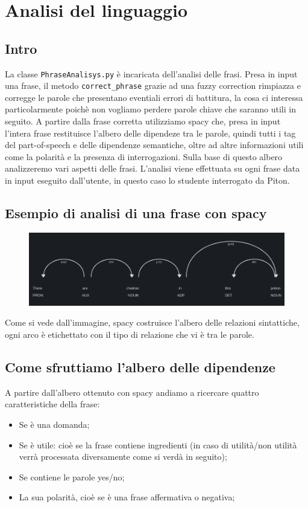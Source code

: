 \section{Analisi del linguaggio}
\subsection{Intro}
La classe \texttt{PhraseAnalisys.py} è incaricata dell'analisi delle frasi.
Presa in input una frase, il metodo \texttt{correct\_phrase} grazie ad una fuzzy correction rimpiazza e corregge le parole che presentano eventiali errori di battitura, la cosa ci interessa particolarmente poichè non vogliamo perdere parole chiave che saranno utili in seguito.
A partire dalla frase corretta  utilizziamo spacy che, presa in input l'intera frase restituisce l'albero delle dipendeze tra le parole, quindi tutti i tag del part-of-speech e delle dipendenze semantiche, oltre ad altre informazioni utili come la polarità e la presenza di interrogazioni. Sulla base di questo albero analizzeremo vari aspetti delle frasi. L'analisi viene effettuata su ogni frase data in input eseguito dall'utente, in questo caso lo studente interrogato da Piton.


\subsection{Esempio di analisi di una frase con spacy}
\begin{figure}[!htb]
    \centering
    \includegraphics[width=16cm]{Images/imgSpacy.png}
\end{figure}
Come si vede dall'immagine, spacy costruisce l'albero delle relazioni sintattiche, ogni arco è etichettato con il tipo di relazione che vi è tra le parole.
\subsection{Come sfruttiamo l'albero delle dipendenze}
A partire dall'albero ottenuto con spacy andiamo a ricercare quattro caratteristiche della frase:
\begin{itemize}
    \item Se è una domanda;
    \item Se è utile: cioè se la frase contiene ingredienti (in caso di utilità/non utilità verrà processata diversamente come si verdà in seguito);
    \item Se contiene le parole yes/no;
    \item La sua polarità, cioè se è una frase affermativa o negativa;
\end{itemize}
